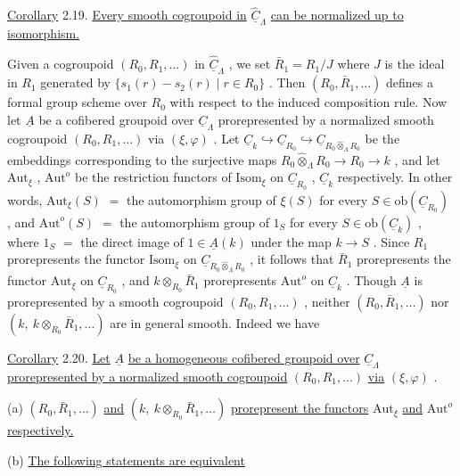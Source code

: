 \underline{Corollary} 2.19.  \underline{Every smooth cogroupoid in}  $\hat{\underline{C}}_\Lambda$  \underline{can be normalized up to isomorphism.}

Given a cogroupoid  $(R_0,R_1,\dots)$  in  $\hat{\underline{C}}_\Lambda$ , we set  $\bar{R}_1 = R_1/J$  where  $J$  is the ideal in  $R_1$  generated by  $\{s_1(r) - s_2(r) \mid r \in R_0\}$ . Then  $(R_0,\bar{R}_1,\dots)$  defines a formal group scheme over  $R_0$  with respect to the induced composition rule. Now let  $\underline{A}$  be a cofibered groupoid over  $\underline{C}_\Lambda$  prorepresented by a normalized smooth cogroupoid  $(R_0,R_1,\dots)$  via  $(\xi,\varphi)$ . Let  $\underline{C}_k \hookrightarrow \underline{C}_{R_0} \hookrightarrow \underline{C}_{R_0 \hat{\otimes}_\Lambda R_0}$  be the embeddings corresponding to the surjective maps  $R_0 \hat{\otimes}_\Lambda R_0 \longrightarrow R_0 \longrightarrow k$ , and let  $\mathrm{Aut}_\xi$ , $\mathrm{Aut}^o$  be the restriction functors of  $\mathrm{Isom}_\xi$  on  $\underline{C}_{R_0}$ , $\underline{C}_k$  respectively. In other words,  $\mathrm{Aut}_\xi(S)$ $=$ the automorphism group of  $\xi(S)$  for every  $S \in \mathrm{ob}(\underline{C}_{R_0})$ , and  $\mathrm{Aut}^o(S)$ $=$ the automorphism group of  $1_S$  for every  $S \in \mathrm{ob}(\underline{C}_k)$ , where  $1_S$ $=$ the direct image of  $1 \in \underline{A}(k)$  under the map  $k \to S$ . Since  $R_1$  prorepresents the functor  $\mathrm{Isom}_\xi$  on  $\underline{C}_{R_0 \hat{\otimes}_\Lambda R_0}$ , it follows that  $\bar{R}_1$  prorepresents the functor  $\mathrm{Aut}_\xi$  on  $\underline{C}_{R_0}$ , and  $k \otimes_{R_0} \bar{R}_1$  prorepresents  $\mathrm{Aut}^o$  on  $\underline{C}_k$ . Though  $\underline{A}$  is prorepresented by a smooth cogroupoid  $(R_0,R_1,\dots)$  , neither  $(R_0,\bar{R}_1,\dots)$  nor  $(k,\ k \otimes_{R_0} \bar{R}_1,\dots)$  are in general smooth. Indeed we have

\underline{Corollary} 2.20.  \underline{Let}  $\underline{A}$  \underline{be a homogeneous cofibered groupoid over}  $\underline{C}_\Lambda$  \underline{prorepresented by a normalized smooth cogroupoid}  $(R_0,R_1,\dots)$  \underline{via}  $(\xi,\varphi)$  .

(a)  $(R_0,\bar{R}_1,\dots)$  \underline{and}  $(k,\ k \otimes_{R_0} \bar{R}_1,\dots)$  \underline{prorepresent the functors}  $\mathrm{Aut}_\xi$  \underline{and}  $\mathrm{Aut}^o$  \underline{respectively.}

(b)  \underline{The following statements are equivalent}


